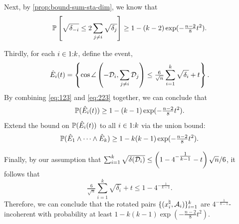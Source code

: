 Next, by \autoref{prop:bound-sum-sta-dim}, we know that 
\begin{equation}\label{eq:223}
  \mathbb{P}\left[ \sqrt{\delta_{-i}} \leq 2\sum_{j\neq i} \sqrt{\delta_j}\right] \geq 1 - (k-2)\exp(-\tfrac{n-2}{8}t^2).
\end{equation}


Thirdly, for each $i\in1\mathord{:}k$, define the event, 
\[
\hat E_i(t) =  \left \{ \cos\angle\left(-\mathcal{D}_i, \sum_{j \neq i}\mathcal{D}_j\right) \leq \tfrac{6}{\sqrt{n}}\sum_{i=1}^k\sqrt{\delta_i} + t\right \}.
\]
By combining \eqref{eq:123} and \eqref{eq:223} together, we can conclude that 
\[\mathbb{P}(\hat E_i(t)) \geq 1 - (k-1)\exp(-\tfrac{n-2}{8}t^2).\]
Extend the bound on $\mathbb{P}(\hat E_i(t))$ to all $i\in1\mathord{:}k$ via the union bound:
\[\mathbb{P}(\hat E_1\land\cdots\land \hat E_k) \geq 1 - k(k-1)\exp(-\tfrac{n-2}{8}t^2).\]

Finally, by our assumption that $\sum_{i=1}^k \sqrt{\delta(\mathcal{D}_i)} \leq \left(1 - 4^{- \tfrac{1}{k-1} } - t\right)\sqrt{n} / 6$, it follows that 
\[\tfrac{6}{\sqrt{n}}\sum_{i=1}^k\sqrt{\delta_i} + t \leq 1 - 4^{- \tfrac{1}{k-1} }.\]
Therefore, we can conclude that the rotated pairs $\{(x_i^{\natural},\mathcal{A}_i)\}_{i=1}^k$ are $4^{- \tfrac{1}{k-1} }$-incoherent with probability at least $1 - k(k-1)\exp(-\tfrac{n-2}{8}t^2)$.










